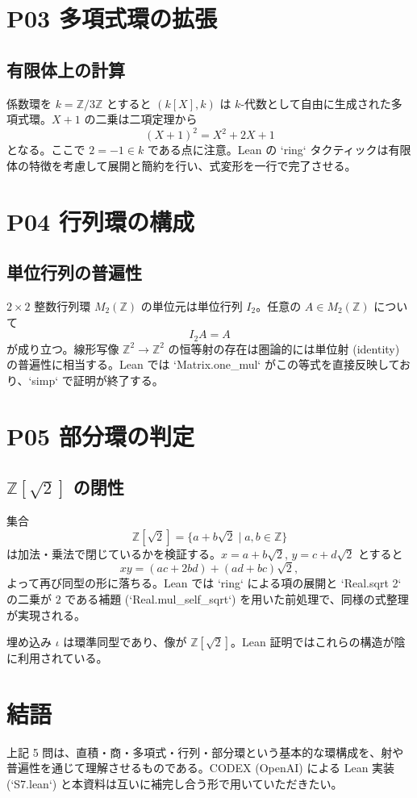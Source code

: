 \documentclass[12pt]{ltjsarticle}
\begin{document}
\section{P03 多項式環の拡張}
\subsection*{有限体上の計算}
係数環を $k=\mathbb{Z}/3\mathbb{Z}$ とすると $(k[X],k)$ は $k$-代数として自由に生成された多項式環。$X+1$ の二乗は二項定理から
\[
(X+1)^2 = X^2 + 2X + 1
\]
となる。ここで $2=-1\in k$ である点に注意。Lean の `ring` タクティックは有限体の特徴を考慮して展開と簡約を行い、式変形を一行で完了させる。

\section{P04 行列環の構成}
\subsection*{単位行列の普遍性}
$2\times 2$ 整数行列環 $M_2(\mathbb{Z})$ の単位元は単位行列 $I_2$。任意の $A\in M_2(\mathbb{Z})$ について
\[
I_2 A = A
\]
が成り立つ。線形写像 $\mathbb{Z}^2\to\mathbb{Z}^2$ の恒等射の存在は圏論的には単位射 (identity) の普遍性に相当する。Lean では `Matrix.one_mul` がこの等式を直接反映しており、`simp` で証明が終了する。

\section{P05 部分環の判定}
\subsection*{$\mathbb{Z}[\sqrt{2}]$ の閉性}
集合
\[
\mathbb{Z}[\sqrt{2}] = \{a+b\sqrt{2}\mid a,b\in\mathbb{Z}\}
\]
は加法・乗法で閉じているかを検証する。$x=a+b\sqrt{2}$, $y=c+d\sqrt{2}$ とすると
\[
xy = (ac+2bd) + (ad+bc)\sqrt{2},
\]
よって再び同型の形に落ちる。Lean では `ring` による項の展開と `Real.sqrt 2` の二乗が $2$ である補題 (`Real.mul_self_sqrt`) を用いた前処理で、同様の式整理が実現される。

\begin{center}
\end{center}

埋め込み $\iota$ は環準同型であり、像が $\mathbb{Z}[\sqrt{2}]$。Lean 証明ではこれらの構造が陰に利用されている。

\section*{結語}
上記 5 問は、直積・商・多項式・行列・部分環という基本的な環構成を、射や普遍性を通じて理解させるものである。CODEX (OpenAI) による Lean 実装 (`S7.lean`) と本資料は互いに補完し合う形で用いていただきたい。
\end{document}

